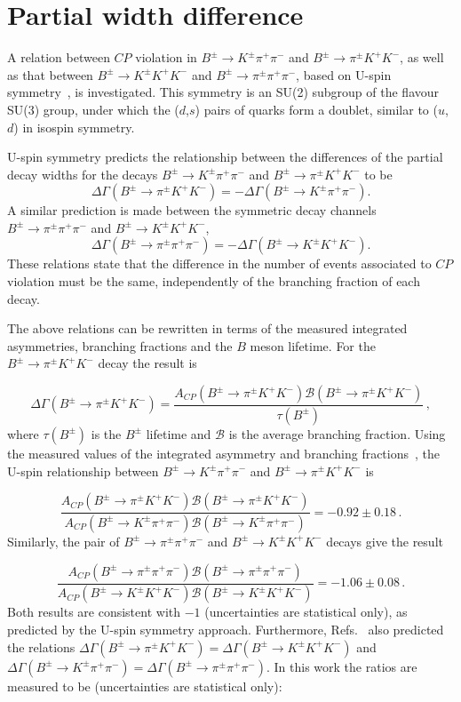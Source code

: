 \documentclass[12pt,a4paper]{article}
\def\Ppi         {\ensuremath{\uppi}\xspace}
\def\PB      {\ensuremath{\mathrm{B}}\xspace}
\def\PK      {\ensuremath{\mathrm{K}}\xspace}
\def\Pd      {\ensuremath{\mathrm{d}}\xspace}
\def\Ps      {\ensuremath{\mathrm{s}}\xspace}
\def\Pu      {\ensuremath{\mathrm{u}}\xspace}
\def\Ppi         {\ensuremath{\pi}\xspace}
\def\PB      {\ensuremath{B}\xspace}
\def\PK      {\ensuremath{K}\xspace}
\def\Pd      {\ensuremath{d}\xspace}
\def\Ps      {\ensuremath{s}\xspace}
\def\Pu      {\ensuremath{u}\xspace}
\def\uquark    {{\ensuremath{\Pu}}\xspace}
\def\dquark    {{\ensuremath{\Pd}}\xspace}
\def\squark    {{\ensuremath{\Ps}}\xspace}
\def\pion   {{\ensuremath{\Ppi}}\xspace}
\def\pip    {{\ensuremath{\pion^+}}\xspace}
\def\pim    {{\ensuremath{\pion^-}}\xspace}
\def\pipm   {{\ensuremath{\pion^\pm}}\xspace}
\def\kaon    {{\ensuremath{\PK}}\xspace}
\def\Kp      {{\ensuremath{\kaon^+}}\xspace}
\def\Km      {{\ensuremath{\kaon^-}}\xspace}
\def\Kpm     {{\ensuremath{\kaon^\pm}}\xspace}
\def\B       {{\ensuremath{\PB}}\xspace}
\def\Bpm     {{\ensuremath{\B^\pm}}\xspace}
\def\to                 {\ensuremath{\rightarrow}\xspace}
\def\CP                {{\ensuremath{C\!P}}\xspace}
\def\pipipi {\ensuremath{{\Bpm \to \pipm \pip \pim}}\xspace}
\def\kpipi {\ensuremath{{\Bpm \to \Kpm \pip \pim}}\xspace}
\def\kkpi {\ensuremath{{\Bpm \to \pipm \Kp \Km }}\xspace}
\def\kkk {\ensuremath{{\Bpm \to \Kpm \Kp \Km}}\xspace}
\def\acp {\ensuremath{A_{\CP}}\xspace}
\begin{document}
\FloatBarrier



\section{Partial width difference}
\label{sec:uspin}
A relation between \CP violation in \kpipi and  \kkpi, as well as that between  \kkk and  \pipipi, based on U-spin symmetry~\cite{Gronau2003,Gronau2013,Gronau2014}, is investigated. This symmetry is an SU(2) subgroup of the flavour SU(3) group, under which the (\dquark,\squark) pairs of quarks form a doublet, similar to (\uquark,\dquark) in isospin symmetry. 

U-spin symmetry predicts the relationship between the differences of the partial decay widths for the decays \kpipi and \kkpi to be 
\begin{equation}
\Delta\Gamma (\kkpi) = - \Delta\Gamma (\kpipi).
\end{equation} 
A similar prediction is made between the symmetric decay channels \pipipi and \kkk,
\begin{equation}
\Delta\Gamma (\pipipi) = -  \Delta\Gamma (\kkk).
\end{equation} 
These relations state that the difference in the number of events associated to \CP violation must be the same, independently of the branching fraction of each decay.

The above relations can be rewritten in terms of the measured integrated asymmetries, branching fractions and the $B$ meson lifetime. For the \kkpi decay the result is

\begin{equation}
\Delta\Gamma (\kkpi) = \frac{\acp(\kkpi)\mathcal{B}(\kkpi)}{\tau(B^\pm)}\,,
\end{equation} 
where $\tau(B^\pm)$ is the $B^\pm$ lifetime and $\mathcal{B}$ is the average branching fraction. Using the measured values of the integrated asymmetry and branching fractions~\cite{LHCb-PAPER-2020-031}, the U-spin relationship between \kpipi and \kkpi is

\begin{equation} \frac{\acp(\kkpi)\mathcal{B}(\kkpi)}{\acp(\kpipi)\mathcal{B}(\kpipi)} = -0.92 \pm 0.18\,. \nonumber
\end{equation} 
Similarly, the pair of \pipipi and \kkk decays give the result

\begin{equation}
\frac{\acp(\pipipi)\mathcal{B}(\pipipi)}{\acp(\kkk)\mathcal{B}(\kkk)} = -1.06 \pm 0.08\,. \nonumber
\end{equation}
Both results are consistent with $-1$ (uncertainties are statistical only), as predicted by the U-spin symmetry approach.
Furthermore, Refs.~\cite{Xu2013, Pat2021} also predicted the relations \hbox{$\Delta\Gamma (\kkpi) = \Delta\Gamma (\kkk)$} and \hbox{$\Delta\Gamma (\kpipi) = \Delta\Gamma (\pipipi)$}. In this work the ratios are measured to be (uncertainties are statistical only):
\end{document}

